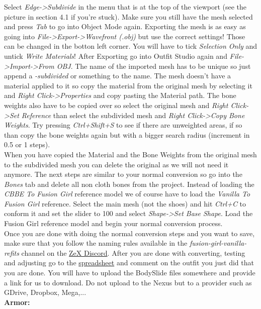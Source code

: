 Select \textit{Edge->Subdivide} in the menu that is at the top of the viewport (see the picture in section 4.1 if you're stuck). 
Make sure you still have the mesh selected and press
\textit{Tab} to go into Object Mode again. Exporting the mesh is as easy as going into \textit{File->Export->Wavefront (.obj)}
but use the correct settings! Those can be changed in the botton left corner. You will have to tick \textit{Selection Only} and untick 
\textit{Write Materials}! After Exporting go into Outfit Studio again and \textit{File->Import->From OBJ}. The name of the imported mesh 
has to be unique so just append a \textit{-subdivided} or something to the name. The mesh doesn't have a material applied to it so 
copy the material from the original mesh by selecting it and \textit{Right Click->Properties} and copy pasting the Material path.
The bone weights also have to be copied over so select the original mesh and \textit{Right Click->Set Reference} than select the subdivided 
mesh and \textit{Right Click->Copy Bone Weights}. Try pressing \textit{Ctrl+Shift+S} to see if there are unweighted areas, if so than 
copy the bone weights again but with a bigger search radius (increment in 0.5 or 1 steps).\\
When you have copied the Material and the Bone Weights from the original mesh to the subdivided mesh you can delete the original as 
we will not need it anymore. The next steps are similar to your normal conversion so go into the \textit{Bones} tab and delete all 
non cloth bones from the project. Instead of loading the \textit{CBBE To Fusion Girl} reference model we of course have to load the 
\textit{Vanilla To Fusion Girl} reference. Select the main mesh (not the shoes) and hit \textit{Ctrl+C} to conform it and set the slider 
to 100 and select \textit{Shape->Set Base Shape}. Load the Fusion Girl reference model and begin your normal conversion process.\\
Once you are done with doing the normal conversion steps and you want to save, make sure that you follow the naming rules available in 
the \textit{fusion-girl-vanilla-refits} channel on the \href{https://discord.gg/9vBqB9}{ZeX Discord}. After you are done with converting, 
testing and adjusting go to the \href{https://tinyurl.com/y2podp84}{spreadsheet} and comment on the outfit you just did that you are done.
You will have to upload the BodySlide files somewhere and provide a link for us to download. Do not upload to the Nexus but to a provider 
such as GDrive, Dropbox, Mega,...\\
\textbf{Armor:}\\
